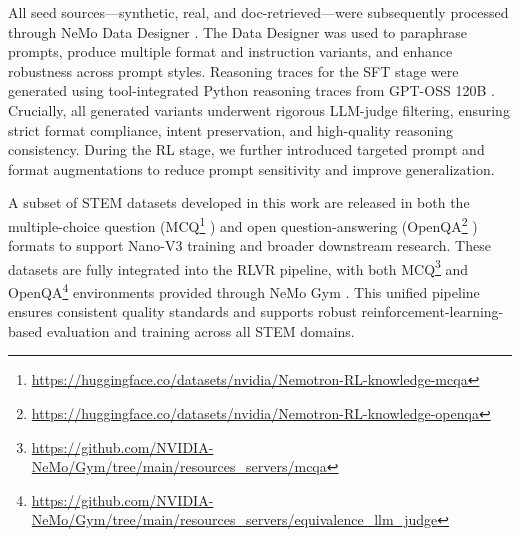 All seed sources—synthetic, real, and doc-retrieved—were subsequently processed through NeMo Data Designer \citep{nemo-data-designer}. The Data Designer was used to paraphrase prompts, produce multiple format and instruction variants, and enhance robustness across prompt styles. Reasoning traces for the SFT stage were generated using tool-integrated Python reasoning traces from GPT-OSS 120B \citep{openai2025gptoss120bgptoss20bmodel}. Crucially, all generated variants underwent rigorous LLM-judge filtering, ensuring strict format compliance, intent preservation, and high-quality reasoning consistency. During the RL stage, we further introduced targeted prompt and format augmentations to reduce prompt sensitivity and improve generalization.

A subset of STEM datasets developed in this work are released in both the multiple-choice question (MCQ\footnote{\url{https://huggingface.co/datasets/nvidia/Nemotron-RL-knowledge-mcqa}}
) and open question-answering (OpenQA\footnote{\url{https://huggingface.co/datasets/nvidia/Nemotron-RL-knowledge-openqa}}
) formats to support Nano-V3 training and broader downstream research. These datasets are fully integrated into the RLVR pipeline, with both MCQ\footnote{\url{https://github.com/NVIDIA-NeMo/Gym/tree/main/resources_servers/mcqa}}
 and OpenQA\footnote{\url{https://github.com/NVIDIA-NeMo/Gym/tree/main/resources_servers/equivalence_llm_judge}}
 environments provided through NeMo Gym \citep{nemo-gym}. This unified pipeline ensures consistent quality standards and supports robust reinforcement-learning-based evaluation and training across all STEM domains.


